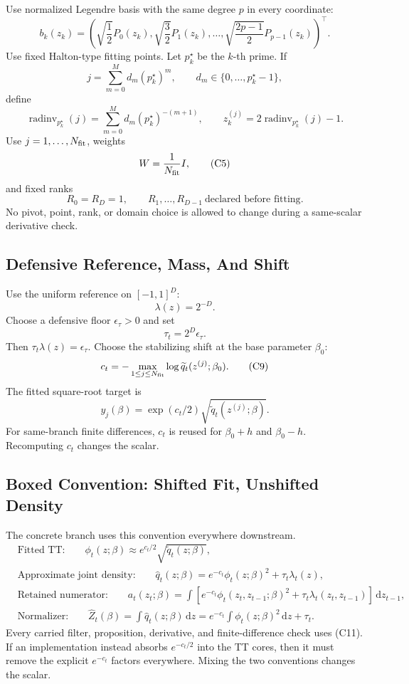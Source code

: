 \documentclass[11pt]{article}
\newcommand{\dd}{\,\mathrm d}
\begin{document}
Use normalized Legendre basis with the same degree \(p\) in every coordinate:
\[
    b_k(z_k)=
    \left(
    \sqrt{\frac12}P_0(z_k),
    \sqrt{\frac32}P_1(z_k),
    \ldots,
    \sqrt{\frac{2p-1}{2}}P_{p-1}(z_k)
    \right)^\top.
    \tag{C3}
\]
Use fixed Halton-type fitting points.  Let \(p_k^\star\) be the \(k\)-th prime.
If
\[
    j=\sum_{m=0}^{M}d_m(p_k^\star)^m,\qquad
    d_m\in\{0,\ldots,p_k^\star-1\},
\]
define
\[
    \operatorname{radinv}_{p_k^\star}(j)
    =
    \sum_{m=0}^{M}d_m(p_k^\star)^{-(m+1)},
    \qquad
    z_k^{(j)}=2\operatorname{radinv}_{p_k^\star}(j)-1.
    \tag{C4}
\]
Use \(j=1,\ldots,N_{\rm fit}\), weights
\[
    W=\frac1{N_{\rm fit}}I,
    \tag{C5}
\]
and fixed ranks
\[
    R_0=R_D=1,\qquad R_1,\ldots,R_{D-1}\ \text{declared before fitting}.
    \tag{C6}
\]
No pivot, point, rank, or domain choice is allowed to change during a
same-scalar derivative check.

\subsection{Defensive Reference, Mass, And Shift}

Use the uniform reference on \([-1,1]^D\):
\[
    \lambda(z)=2^{-D}.
    \tag{C7}
\]
Choose a defensive floor \(\epsilon_\tau>0\) and set
\[
    \tau_t=2^D\epsilon_\tau.
    \tag{C8}
\]
Then \(\tau_t\lambda(z)=\epsilon_\tau\).  Choose the stabilizing shift at the
base parameter \(\beta_0\):
\[
    c_t=-\max_{1\le j\le N_{\rm fit}}
    \log \widetilde q_t(z^{(j)};\beta_0).
    \tag{C9}
\]
The fitted square-root target is
\[
    y_j(\beta)=\exp(c_t/2)\sqrt{\widetilde q_t(z^{(j)};\beta)}.
    \tag{C10}
\]
For same-branch finite differences, \(c_t\) is reused for
\(\beta_0+h\) and \(\beta_0-h\).  Recomputing \(c_t\) changes the scalar.

\subsection{Boxed Convention: Shifted Fit, Unshifted Density}

The concrete branch uses this convention everywhere downstream.
\[
\boxed{
\begin{aligned}
&\text{Fitted TT:}\qquad
  \phi_t(z;\beta)\approx e^{c_t/2}\sqrt{\widetilde q_t(z;\beta)},\\
&\text{Approximate joint density:}\qquad
  \widehat q_t(z;\beta)
  =
  e^{-c_t}\phi_t(z;\beta)^2+\tau_t\lambda_t(z),\\
&\text{Retained numerator:}\qquad
  a_t(z_t;\beta)
  =
  \int
  \left[e^{-c_t}\phi_t(z_t,z_{t-1};\beta)^2
        +\tau_t\lambda_t(z_t,z_{t-1})\right]\dd z_{t-1},\\
&\text{Normalizer:}\qquad
  \widehat Z_t(\beta)
  =
  \int \widehat q_t(z;\beta)\dd z
  =
  e^{-c_t}\int\phi_t(z;\beta)^2\dd z+\tau_t.
\end{aligned}}
\tag{C11}
\]
Every carried filter, proposition, derivative, and finite-difference check uses
(C11).  If an implementation instead absorbs \(e^{-c_t/2}\) into the TT cores,
then it must remove the explicit \(e^{-c_t}\) factors everywhere.  Mixing the
two conventions changes the scalar.
\end{document}
